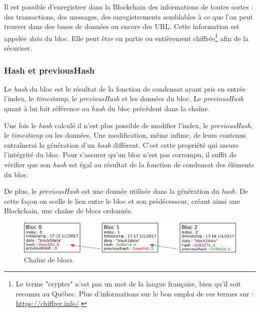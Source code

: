 \documentclass{article}
\begin{document}
Il est possible d'enregistrer dans la Blockchain des informations de toutes sortes : des transactions, des messages, des enregistrements semblables à ce que l'on peut trouver dans des bases de données ou encore des URL. Cette information est appelée \textit{data} du bloc. Elle peut être en partie ou entièrement chiffrée\footnote{Le terme "crypter" n'est pas un mot de la langue française, bien qu'il soit reconnu au Québec. Plus d'informations sur le bon emploi de ces termes sur : \url{https://chiffrer.info/}.} afin de la sécuriser.


\subsubsection*{Hash et previousHash}

Le \textit{hash} du bloc est le résultat de la fonction de condensat ayant pris en entrée l'index, le \textit{timestamp}, le \textit{previousHash} et les données du bloc. Le \textit{previousHash} quant à lui fait référence au \textit{hash} du bloc précédent dans la chaîne. 

Une fois le \textit{hash} calculé il n'est plus possible de modifier l'index, le \textit{previousHash}, le \textit{timestamp} ou les données. Une modification, même infime, de leurs contenus entraînerai la génération d'un \textit{hash} différent. C'est cette propriété qui assure l'intégrité du bloc. Pour s'assurer qu'un bloc n'est pas corrompu, il suffit de vérifier que son \textit{hash} est égal au résultat de la fonction de condensat des éléments du bloc. 

De plus, le \textit{previousHash} est une donnée utilisée dans la génération du \textit{hash}. De cette façon on scelle le lien entre le bloc et son prédécesseur, créant ainsi une Blockchain, une chaîne de blocs ordonnés.

\begin{figure}[!h]
    \centering
    \vspace{20pt}
    \includegraphics[scale=0.7]{blockchain.png}
    \caption{Chaîne de blocs.}
    \label{fig:my_label}
\end{figure}
\end{document}
